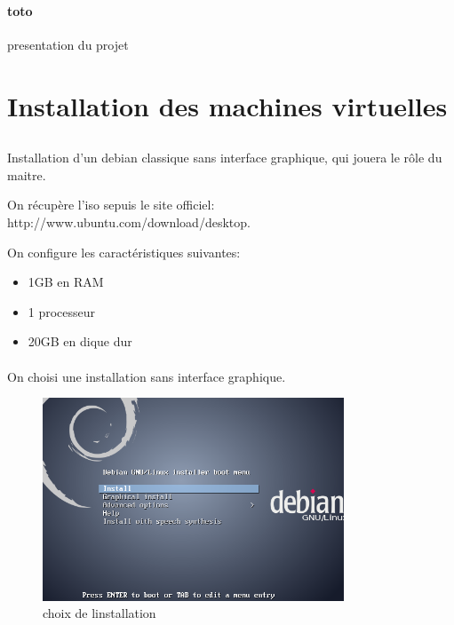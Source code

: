 \documentclass[11pt,a4paper,titlepage, oneside]{article}
\begin{document}
	\paragraph{toto}
		presentation du projet
		
		
\newpage
\thispagestyle{empty}
\tableofcontents
\listoffigures  %

\newpage
{} \setcounter{page}{1}
\section{{\color{red}Installation des machines virtuelles}}
\subsection{{\color{blue}{Installation du serveur Debian}}}
	\paragraph{}
		Installation d'un debian classique sans interface graphique, qui jouera le rôle du maitre.
		
		On récupère l'iso sepuis le site officiel: http://www.ubuntu.com/download/desktop.

		On configure les caractéristiques suivantes:
		\begin{itemize}
                        \item{1GB en RAM}
                        \item{1 processeur}
                        \item{20GB en dique dur}
                \end{itemize}
 		\paragraph{}
		On choisi une installation sans interface graphique.
		 \begin{figure}[h]
                        \centering
                        \includegraphics[width=0.8\textwidth,natwidth=610,natheight=642]{images/debian1.png}
                        \caption{choix de linstallation}
                \end{figure}
		
\end{document}
